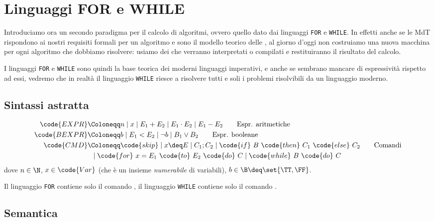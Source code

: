\section{Linguaggi FOR e WHILE}

Introduciamo ora un secondo paradigma per il calcolo di algoritmi, ovvero quello dato dai linguaggi \texttt{FOR} e \texttt{WHILE}. In effetti anche se le MdT rispondono ai nostri requisiti formali per un algoritmo e sono il modello teorico delle , al giorno d'oggi non costruiamo una nuova macchina per ogni algoritmo che dobbiamo risolvere: usiamo dei  che verranno interpretati o compilati e restituiranno il risultato del calcolo.

I linguaggi \texttt{FOR} e \texttt{WHILE} sono quindi la base teorica dei moderni linguaggi imperativi, e anche se sembrano mancare di espressività rispetto ad essi, vedremo che in realtà il linguaggio \texttt{WHILE} riesce a risolvere tutti e soli i problemi risolvibili da un linguaggio moderno.

\subsection*{Sintassi astratta}

\begin{definition}
    \begin{align}
        \code{EXPR} &\Coloneqq n \mid x \mid E_1 + E_2 \mid E_1 \cdot E_2 \mid E_1 - E_2 \tag*{Espr. aritmetiche}\\
        \code{BEXPR} &\Coloneqq b \mid E_1 < E_2 \mid \neg b \mid B_1 \lor B_2 \tag*{Espr. booleane} \\
        \code{CMD} &\Coloneqq \code{skip} \mid x \deq E \mid C_1;C_2 \mid \code{if}\ B\ \code{then}\ C_1\ \code{else}\ C_2 \tag*{Comandi} \\
        &\;\;\mid \code{for}\ x = E_1\ \code{to}\ E_2\ \code{do}\ C \mid \code{while}\ B\ \code{do}\ C \tag*{}
    \end{align}
    dove $n \in \N$, $x \in \code{Var}$ (che è un insieme \emph{numerabile} di variabili), $b \in \B \deq \set{\TT, \FF}$. 

    Il linguaggio \texttt{FOR} contiene solo il comando , il linguaggio \texttt{WHILE} contiene solo il comando .
\end{definition}

\subsection*{Semantica}

